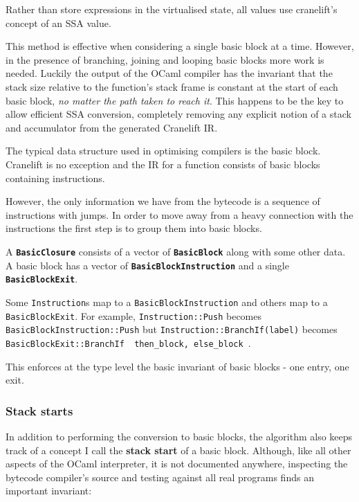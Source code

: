 Rather than store expressions in the virtualised state, all values use cranelift's concept of an
SSA value.

This method is effective when considering a single basic block at a time. However, in the presence
of branching, joining and looping basic blocks more work is needed. Luckily the output of the OCaml
compiler has the invariant that the stack size relative to the function's stack frame is constant
at the start of each basic block, \emph{no matter the path taken to reach it}. This happens to be
the key to allow efficient SSA conversion, completely removing any explicit notion of a stack and
accumulator from the generated Cranelift IR.

\label{opt-bb}

The typical data structure used in optimising compilers is the basic block. Cranelift is no
exception and the IR for a function consists of basic blocks containing instructions.

However, the only information we have from the bytecode is a sequence of instructions with jumps.
In order to move away from a heavy connection with the instructions the first step is to group them
into
basic blocks.


A \textbf{\texttt{BasicClosure}} consists of a vector of \textbf{\texttt{BasicBlock}} along with
some other data. A basic block has a vector of \textbf{\texttt{BasicBlockInstruction}} and a single
\textbf{\texttt{BasicBlockExit}}.

Some \texttt{Instruction}s map to a \texttt{BasicBlockInstruction} and others map to a
\texttt{BasicBlockExit}. For example, \texttt{Instruction::Push} becomes
\texttt{BasicBlockInstruction::Push} but \texttt{Instruction::BranchIf(label)} becomes
\texttt{BasicBlockExit::BranchIf { then\_block, else\_block }}.

This enforces at the type level the basic invariant of basic blocks - one entry, one exit.

\subsubsection{Stack starts}

In addition to performing the conversion to basic blocks, the algorithm also keeps track of a
concept I call the \textbf{stack start} of a basic block. Although, like all other aspects of the
OCaml interpreter, it is not documented anywhere, inspecting the bytecode compiler's source and
testing against all real programs finds an important invariant:

